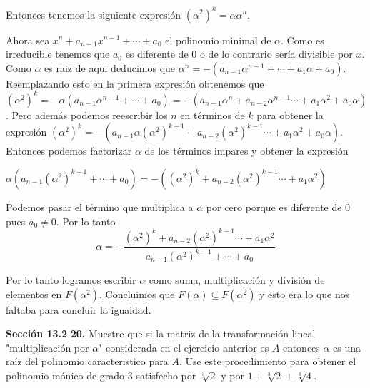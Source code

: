 \documentclass[letter,twoside,12pt]{article}
\begin{document}
Entonces tenemos la siguiente expresión $ (\alpha^2)^k = \alpha\alpha^n $.

Ahora sea $ x^n+a_{n-1}x^{n-1}+\cdots + a_0 $ el polinomio minimal de $ \alpha $. Como es irreducible tenemos que $ a_0 $ es diferente de 0 o de lo contrario sería divisible por $ x $. Como $ \alpha $ es raiz de aqui deducimos que $ \alpha^n =-(a_{n-1}\alpha^{n-1}+\cdots + a_1\alpha +a_0) $. Reemplazando esto en la primera expresión obtenemos que
$ (\alpha^2)^k = -\alpha(a_{n-1}\alpha^{n-1}+\cdots + a_0) = -(a_{n-1}\alpha^{n}+a_{n-2}\alpha^{n-1}\cdots + a_1\alpha^2+a_0\alpha) $.
Pero además podemos reescribir los $ n $ en términos de $ k $ para obtener la expresión $ (\alpha^2)^k =  -(a_{n-1}\alpha(\alpha^2)^{k-1}+a_{n-2}(\alpha^2)^{k-1}\cdots + a_1\alpha^2+a_0\alpha) $. Entonces podemos factorizar $ \alpha $ de los términos impares y obtener la expresión

$ \alpha(a_{n-1}(\alpha^2)^{k-1} + \cdots + a_0)  =  -( (\alpha^2)^k+a_{n-2}(\alpha^2)^{k-1}\cdots + a_1\alpha^2) $

Podemos pasar el término que multiplica a $ \alpha $ por cero porque es diferente de 0 pues $ a_0 \not = 0$. Por lo tanto
\begin{equation}
\alpha = -\frac{(\alpha^2)^k+a_{n-2}(\alpha^2)^{k-1}\cdots + a_1\alpha^2}{a_{n-1}(\alpha^2)^{k-1} + \cdots + a_0} \nonumber
\end{equation}

Por lo tanto logramos escribir $ \alpha $ como suma, multiplicación y división de elementos en $ F(\alpha^2) $. Concluimos que $ F(\alpha) \subseteq F(\alpha^2) $ y esto era lo que nos faltaba para concluir la igualdad. 

\textbf{Sección 13.2} \textbf{20.} Muestre que si la matriz de la transformación lineal "multiplicación por $ \alpha $" considerada en el ejercicio anterior es $ A $ entonces $ \alpha $ es una raíz del polinomio caracteristico para $ A $. Use este procedimiento para obtener el polinomio mónico de grado 3 satisfecho por $ \sqrt[3]{2} $ y por $ 1+\sqrt[3]{2}+\sqrt[3]{4} $.
\end{document}
